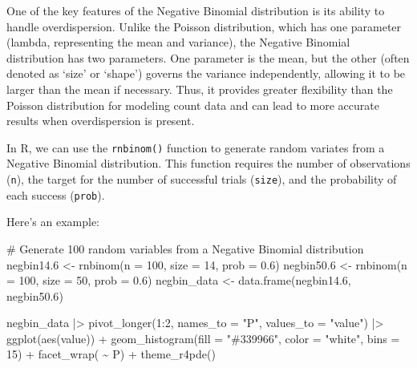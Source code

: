 \documentclass[
  letterpaper,
]{book}
\newenvironment{Shaded}{\begin{snugshade}}{\end{snugshade}}
\newcommand{\AttributeTok}[1]{\textcolor[rgb]{0.40,0.45,0.13}{#1}}
\newcommand{\CommentTok}[1]{\textcolor[rgb]{0.37,0.37,0.37}{#1}}
\newcommand{\DecValTok}[1]{\textcolor[rgb]{0.68,0.00,0.00}{#1}}
\newcommand{\FloatTok}[1]{\textcolor[rgb]{0.68,0.00,0.00}{#1}}
\newcommand{\FunctionTok}[1]{\textcolor[rgb]{0.28,0.35,0.67}{#1}}
\newcommand{\NormalTok}[1]{\textcolor[rgb]{0.00,0.23,0.31}{#1}}
\newcommand{\OtherTok}[1]{\textcolor[rgb]{0.00,0.23,0.31}{#1}}
\newcommand{\SpecialCharTok}[1]{\textcolor[rgb]{0.37,0.37,0.37}{#1}}
\newcommand{\StringTok}[1]{\textcolor[rgb]{0.13,0.47,0.30}{#1}}
\begin{document}
One of the key features of the Negative Binomial distribution is its
ability to handle overdispersion. Unlike the Poisson distribution, which
has one parameter (lambda, representing the mean and variance), the
Negative Binomial distribution has two parameters. One parameter is the
mean, but the other (often denoted as `size' or `shape') governs the
variance independently, allowing it to be larger than the mean if
necessary. Thus, it provides greater flexibility than the Poisson
distribution for modeling count data and can lead to more accurate
results when overdispersion is present.

In R, we can use the \texttt{rnbinom()} function to generate random
variates from a Negative Binomial distribution. This function requires
the number of observations (\texttt{n}), the target for the number of
successful trials (\texttt{size}), and the probability of each success
(\texttt{prob}).

Here's an example:

\begin{Shaded}
\begin{Highlighting}[]
\CommentTok{\# Generate 100 random variables from a Negative Binomial distribution}
\NormalTok{negbin14}\FloatTok{.6} \OtherTok{\textless{}{-}} \FunctionTok{rnbinom}\NormalTok{(}\AttributeTok{n =} \DecValTok{100}\NormalTok{, }\AttributeTok{size =} \DecValTok{14}\NormalTok{, }\AttributeTok{prob =} \FloatTok{0.6}\NormalTok{)}
\NormalTok{negbin50}\FloatTok{.6} \OtherTok{\textless{}{-}} \FunctionTok{rnbinom}\NormalTok{(}\AttributeTok{n =} \DecValTok{100}\NormalTok{, }\AttributeTok{size =} \DecValTok{50}\NormalTok{, }\AttributeTok{prob =} \FloatTok{0.6}\NormalTok{)}
\NormalTok{negbin\_data }\OtherTok{\textless{}{-}} \FunctionTok{data.frame}\NormalTok{(negbin14}\FloatTok{.6}\NormalTok{, negbin50}\FloatTok{.6}\NormalTok{)}
\end{Highlighting}
\end{Shaded}

\begin{Shaded}
\begin{Highlighting}[]
\NormalTok{negbin\_data }\SpecialCharTok{|\textgreater{}}
  \FunctionTok{pivot\_longer}\NormalTok{(}\DecValTok{1}\SpecialCharTok{:}\DecValTok{2}\NormalTok{, }\AttributeTok{names\_to =} \StringTok{"P"}\NormalTok{,}
               \AttributeTok{values\_to =} \StringTok{"value"}\NormalTok{) }\SpecialCharTok{|\textgreater{}}
  \FunctionTok{ggplot}\NormalTok{(}\FunctionTok{aes}\NormalTok{(value)) }\SpecialCharTok{+}
  \FunctionTok{geom\_histogram}\NormalTok{(}\AttributeTok{fill =} \StringTok{"\#339966"}\NormalTok{,}
                 \AttributeTok{color =} \StringTok{"white"}\NormalTok{, }\AttributeTok{bins =} \DecValTok{15}\NormalTok{) }\SpecialCharTok{+}
  \FunctionTok{facet\_wrap}\NormalTok{( }\SpecialCharTok{\textasciitilde{}}\NormalTok{ P) }\SpecialCharTok{+}
  \FunctionTok{theme\_r4pde}\NormalTok{()}
\end{Highlighting}
\end{Shaded}
\end{document}
